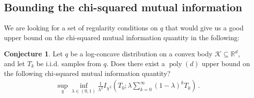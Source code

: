 \documentclass{article}
\theoremstyle{plain}
\theoremstyle{definition}
\newtheorem{conjecture}[theorem]{Conjecture}
\theoremstyle{plain}
\newcommand{\Rd}{\mathbb{R}^d}
\newcommand{\cK}{\mathcal K}
\newcommand{\poly}{\operatorname{poly}}
\begin{document}
\clearpage
\subsection{Bounding the chi-squared mutual information}
We are looking for a set of regularity conditions on $q$ that would give us a good upper bound on the chi-squared mutual information quantity in the following:
\begin{conjecture}\label{conj:logconcave_chi2_poly_d}
    Let $q$ be a log-concave distribution on a convex body $\cK\subseteq \Rd$, and let $T_k$ be i.i.d. samples from $q$.
    Does there exist a $\poly(d)$ upper bound on the following chi-squared mutual information quantity?
    \begin{align}
        \sup_{q} \inf_{\lambda\in(0,1)} \frac{1}{\lambda^2} I_{\chi^2}\left(T_0; \lambda \sum_{k=0}^\infty (1-\lambda)^k T_k\right)\,.
    \end{align}
\end{conjecture}
\end{document}
